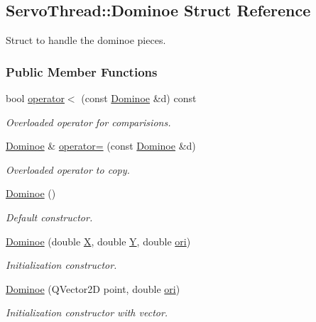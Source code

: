 \hypertarget{a00002}{}\subsection{Servo\+Thread\+:\+:Dominoe Struct Reference}
\label{a00002}


Struct to handle the dominoe pieces.  


\subsubsection*{Public Member Functions}
\begin{DoxyCompactItemize}
\item 
bool \hyperlink{a00002_ab2bda7d8d5ea90e61e3904c87bf01245}{operator$<$} (const \hyperlink{a00002}{Dominoe} \&d) const 
\begin{DoxyCompactList}\small\item\em Overloaded operator for comparisions. \end{DoxyCompactList}\item 
\hyperlink{a00002}{Dominoe} \& \hyperlink{a00002_af7ad901ee679234b8826af58a13fba45}{operator=} (const \hyperlink{a00002}{Dominoe} \&d)
\begin{DoxyCompactList}\small\item\em Overloaded operator to copy. \end{DoxyCompactList}\item 
\hyperlink{a00002_aa9c033e180ad43bfe5127e96cef77b9d}{Dominoe} ()
\begin{DoxyCompactList}\small\item\em Default constructor. \end{DoxyCompactList}\item 
\hyperlink{a00002_a9cd75d2de5cec349594c40c321c204c4}{Dominoe} (double \hyperlink{a00002_a8caa44969c79e0e46576da349957975b}{X}, double \hyperlink{a00002_ae7711996c8204586b6d8a5e657c4b06a}{Y}, double \hyperlink{a00002_a451efc4d2eb2f1dd10006c6c49846e8d}{ori})
\begin{DoxyCompactList}\small\item\em Initialization constructor. \end{DoxyCompactList}\item 
\hyperlink{a00002_aea355d23a1420ef5206bdcf6d60070da}{Dominoe} (Q\+Vector2\+D point, double \hyperlink{a00002_a451efc4d2eb2f1dd10006c6c49846e8d}{ori})
\begin{DoxyCompactList}\small\item\em Initialization constructor with vector. \end{DoxyCompactList}\end{DoxyCompactItemize}
